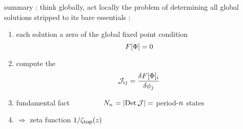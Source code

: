 \begin{frame}{summary : think globally, act locally}
\bigskip
the problem of determining all global solutions stripped
to its bare essentials :
\bigskip
\begin{enumerate}
              \item
each solution a zero of the global {\color{blue}fixed point} condition
\[
F[\Phi] = 0
\]
              \item
compute  the {\jacobianOrb}
\[
{\cal J}_{ij} =\frac{\delta F[\Phi]_i}{\delta \phi_j}
\]
              \item
{\color{blue}fundamental fact} ~~~~~~~~
\(
N_{n_{}} = |\mbox{\rm Det}\,{\cal J}| =
\)
 period-${n_{}}$ states

 \bigskip
              \item
\hfill $\Rightarrow$ {\color{blue}zeta function} $1/\zeta_{\mbox{\footnotesize top}} (z)$
            \end{enumerate}
\end{frame} %

\section[\catlatt]
 {\catlatt}
\label{s:catLatt}




